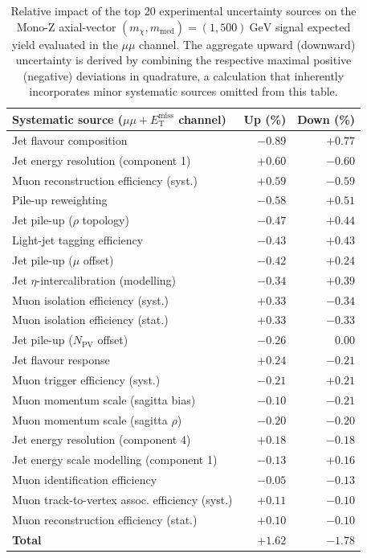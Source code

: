 \begin{table}[!htbp]
\centering
\begin{tabular}{lrr}
\toprule
\textbf{Systematic source} ($\mu\mu + E_{\text{T}}^{\text{miss}}$ channel) & \textbf{Up (\%)} & \textbf{Down (\%)} \\
\midrule
Jet flavour composition                         & $-0.89$ & $+0.77$ \\
Jet energy resolution (component 1)             & $+0.60$ & $-0.60$ \\
Muon reconstruction efficiency (syst.)          & $+0.59$ & $-0.59$ \\
Pile-up reweighting                             & $-0.58$ & $+0.51$ \\
Jet pile-up ($\rho$ topology)                   & $-0.47$ & $+0.44$ \\
Light-jet tagging efficiency                    & $-0.43$ & $+0.43$ \\
Jet pile-up ($\mu$ offset)                      & $-0.42$ & $+0.24$ \\
Jet $\eta$-intercalibration (modelling)         & $-0.34$ & $+0.39$ \\
Muon isolation efficiency (syst.)               & $+0.33$ & $-0.34$ \\
Muon isolation efficiency (stat.)               & $+0.33$ & $-0.33$ \\
Jet pile-up ($N_{\text{PV}}$ offset)            & $-0.26$ &  $0.00$ \\
Jet flavour response                            & $+0.24$ & $-0.21$ \\
Muon trigger efficiency (syst.)                 & $-0.21$ & $+0.21$ \\
Muon momentum scale (sagitta bias)              & $-0.10$ & $-0.21$ \\
Muon momentum scale (sagitta $\rho$)            & $-0.20$ & $-0.20$ \\
Jet energy resolution (component 4)             & $+0.18$ & $-0.18$ \\
Jet energy scale modelling (component 1)        & $-0.13$ & $+0.16$ \\
Muon identification efficiency                  & $-0.05$ & $-0.13$ \\
Muon track-to-vertex assoc. efficiency (syst.)  & $+0.11$ & $-0.10$ \\
Muon reconstruction efficiency (stat.)          & $+0.10$ & $-0.10$ \\
\midrule
\textbf{Total} & $+1.62$ & $-1.78$ \\    
\bottomrule
\end{tabular}
\caption{\rm Relative impact of the top 20 experimental uncertainty sources on the Mono-$\text{Z}$ axial-vector $(m_\chi, m_{\text{med}}) = (1, 500)~\text{GeV}$ signal expected yield evaluated in the $\mu\mu$ channel. The aggregate upward (downward) uncertainty is derived by combining the respective maximal positive (negative) deviations in quadrature, a calculation that inherently incorporates minor systematic sources omitted from this table.}
\label{tab:syst-uncertainties-MonoZ-mm}
\end{table}

